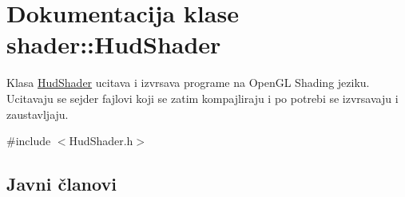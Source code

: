 \hypertarget{classshader_1_1HudShader}{}\section{Dokumentacija klase shader\+:\+:Hud\+Shader}
\label{classshader_1_1HudShader}


Klasa \hyperlink{classshader_1_1HudShader}{Hud\+Shader} ucitava i izvrsava programe na Open\+GL Shading jeziku. Ucitavaju se sejder fajlovi koji se zatim kompajliraju i po potrebi se izvrsavaju i zaustavljaju.  




{\ttfamily \#include $<$Hud\+Shader.\+h$>$}

\subsection*{Javni članovi}
